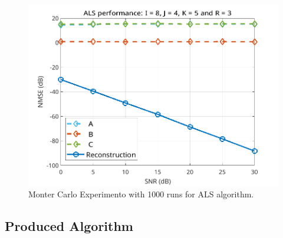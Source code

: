 \documentclass[a4paper,10pt]{article}
\begin{document}
    \begin{figure}[ht!]
        \centering 
        \includegraphics[width=0.75\linewidth]{figs/hw11a2.png} \par 
        \caption{Monter Carlo Experimento with 1000 runs for ALS algorithm.}
        \label{fig:hw11a2} 
    \end{figure}

    \newpage
    \subsection*{Produced Algorithm}
\end{document}

